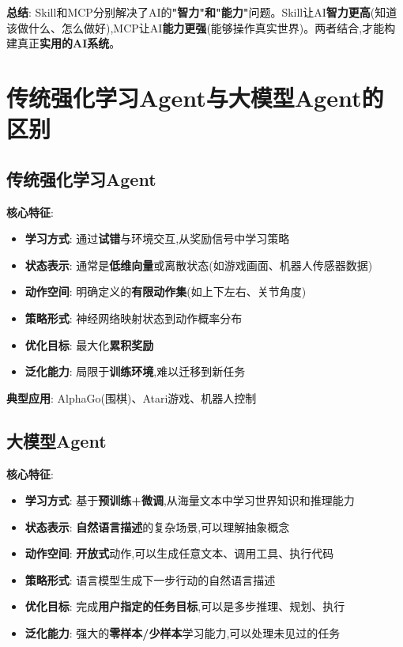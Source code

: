 \documentclass[UTF8]{ctexart}
\begin{document}
\textbf{总结}: Skill和MCP分别解决了AI的\textbf{"智力"和"能力"}问题。Skill让AI\textbf{智力更高}(知道该做什么、怎么做好),MCP让AI\textbf{能力更强}(能够操作真实世界)。两者结合,才能构建真正\textbf{实用的AI系统}。

\section{传统强化学习Agent与大模型Agent的区别}

\subsection{传统强化学习Agent}

\textbf{核心特征}:
\begin{itemize}
    \item \textbf{学习方式}: 通过\textbf{试错}与环境交互,从奖励信号中学习策略
    \item \textbf{状态表示}: 通常是\textbf{低维向量}或离散状态(如游戏画面、机器人传感器数据)
    \item \textbf{动作空间}: 明确定义的\textbf{有限动作集}(如上下左右、关节角度)
    \item \textbf{策略形式}: 神经网络映射状态到动作概率分布
    \item \textbf{优化目标}: 最大化\textbf{累积奖励}
    \item \textbf{泛化能力}: 局限于\textbf{训练环境},难以迁移到新任务
\end{itemize}

\textbf{典型应用}: AlphaGo(围棋)、Atari游戏、机器人控制

\subsection{大模型Agent}

\textbf{核心特征}:
\begin{itemize}
    \item \textbf{学习方式}: 基于\textbf{预训练+微调},从海量文本中学习世界知识和推理能力
    \item \textbf{状态表示}: \textbf{自然语言描述}的复杂场景,可以理解抽象概念
    \item \textbf{动作空间}: \textbf{开放式}动作,可以生成任意文本、调用工具、执行代码
    \item \textbf{策略形式}: 语言模型生成下一步行动的自然语言描述
    \item \textbf{优化目标}: 完成\textbf{用户指定的任务目标},可以是多步推理、规划、执行
    \item \textbf{泛化能力}: 强大的\textbf{零样本/少样本}学习能力,可以处理未见过的任务
\end{itemize}
\end{document}
